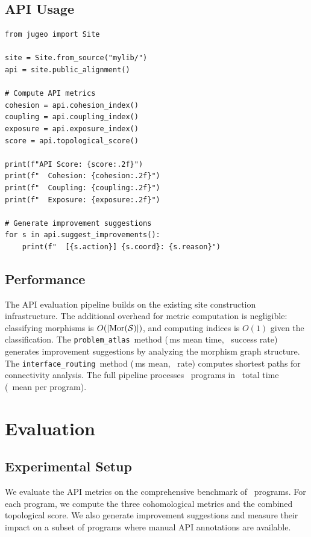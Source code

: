 \documentclass[11pt]{article}
\newcommand{\InterfRoute}{\texttt{interface\_routing}}
\newcommand{\ProbAtlas}{\texttt{problem\_atlas}}
\begin{document}
\subsection{API Usage}
\begin{lstlisting}[style=jugeo-python]
from jugeo import Site

site = Site.from_source("mylib/")
api = site.public_alignment()

# Compute API metrics
cohesion = api.cohesion_index()
coupling = api.coupling_index()
exposure = api.exposure_index()
score = api.topological_score()

print(f"API Score: {score:.2f}")
print(f"  Cohesion: {cohesion:.2f}")
print(f"  Coupling: {coupling:.2f}")
print(f"  Exposure: {exposure:.2f}")

# Generate improvement suggestions
for s in api.suggest_improvements():
    print(f"  [{s.action}] {s.coord}: {s.reason}")
\end{lstlisting}

\subsection{Performance}
The API evaluation pipeline builds on the existing site construction
infrastructure.  The additional overhead for metric computation is
negligible: classifying morphisms is $O(|\mathrm{Mor}(\mathcal{S})|)$, and computing
indices is $O(1)$ given the classification.  The \ProbAtlas\ method
(\compProfProblemAtlasMeanMs\,ms mean time, \compProfProblemAtlasRate\
success rate) generates improvement suggestions by analyzing the morphism
graph structure.  The \InterfRoute\ method
(\compProfInterfaceRoutingMeanMs\,ms mean, \compProfInterfaceRoutingRate\
rate) computes shortest paths for connectivity analysis.  The full pipeline
processes \compTotalPrograms\ programs in \compTimeTotal\ total time
(\compTimeMean\ mean per program).

\section{Evaluation}\label{sec:evaluation}

\subsection{Experimental Setup}
We evaluate the API metrics on the comprehensive benchmark of
\compTotalPrograms\ programs.  For each program, we compute the three
cohomological metrics and the combined topological score.  We also
generate improvement suggestions and measure their impact on a subset of
programs where manual API annotations are available.
\end{document}
